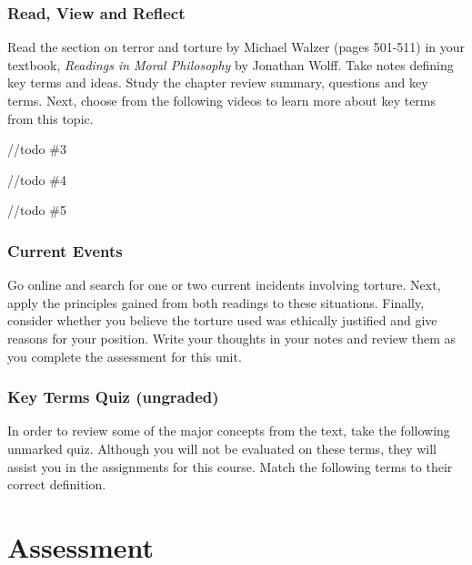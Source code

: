 \documentclass[
]{book}
\begin{document}
\begin{reflect}
\hypertarget{read-view-and-reflect-30}{%
\subsubsection*{Read, View and Reflect}\label{read-view-and-reflect-30}}

Read the section on terror and torture by Michael Walzer (pages 501-511) in your textbook, \emph{Readings in Moral Philosophy} by Jonathan Wolff. Take notes defining key terms and ideas. Study the chapter review summary, questions and key terms.
Next, choose from the following videos to learn more about key terms from this topic.

//todo \#3

//todo \#4

//todo \#5

\hypertarget{current-events}{%
\subsubsection*{Current Events}\label{current-events}}

Go online and search for one or two current incidents involving torture. Next, apply the principles gained from both readings to these situations. Finally, consider whether you believe the torture used was ethically justified and give reasons for your position. Write your thoughts in your notes and review them as you complete the assessment for this unit.

\hypertarget{key-terms-quiz-ungraded-7}{%
\subsubsection*{Key Terms Quiz (ungraded)}\label{key-terms-quiz-ungraded-7}}

In order to review some of the major concepts from the text, take the following unmarked quiz. Although you will not be evaluated on these terms, they will assist you in the assignments for this course.
Match the following terms to their correct definition.
\end{reflect}

\hypertarget{assessment-8}{%
\section*{Assessment}\label{assessment-8}}
\end{document}
